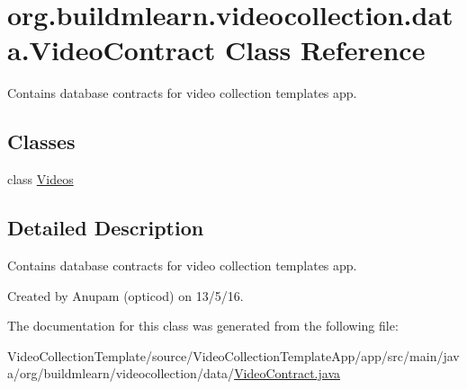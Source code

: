 \hypertarget{classorg_1_1buildmlearn_1_1videocollection_1_1data_1_1VideoContract}{}\section{org.\+buildmlearn.\+videocollection.\+data.\+Video\+Contract Class Reference}
\label{classorg_1_1buildmlearn_1_1videocollection_1_1data_1_1VideoContract}


Contains database contracts for video collection template\textquotesingle{}s app.  


\subsection*{Classes}
\begin{DoxyCompactItemize}
\item 
class \hyperlink{classorg_1_1buildmlearn_1_1videocollection_1_1data_1_1VideoContract_1_1Videos}{Videos}
\end{DoxyCompactItemize}


\subsection{Detailed Description}
Contains database contracts for video collection template\textquotesingle{}s app. 

Created by Anupam (opticod) on 13/5/16. 

The documentation for this class was generated from the following file\+:\begin{DoxyCompactItemize}
\item 
Video\+Collection\+Template/source/\+Video\+Collection\+Template\+App/app/src/main/java/org/buildmlearn/videocollection/data/\hyperlink{VideoContract_8java}{Video\+Contract.\+java}\end{DoxyCompactItemize}

